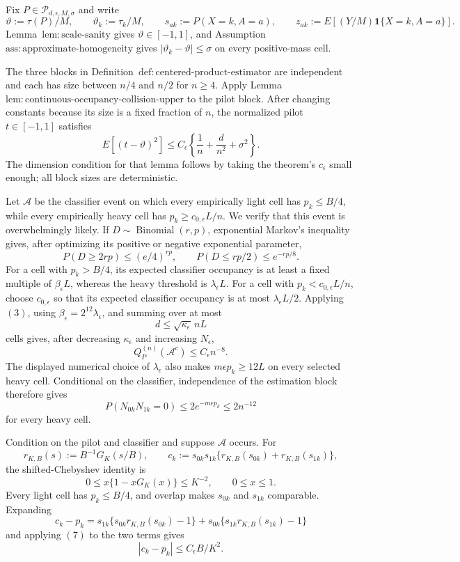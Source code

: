 Fix \(P\in\mathcal P_{d,\epsilon,M,\sigma}\) and write
\[
 \vartheta:=\tau(P)/M,\qquad
 \vartheta_k:=\tau_k/M,\qquad
 s_{ak}:=P(X=k,A=a),\qquad
 z_{ak}:=E[(Y/M)\mathbf 1\{X=k,A=a\}].
\tag{1}
\]
Lemma~\(\mathrm{lem:scale\text{-}sanity}\) gives \(\vartheta\in[-1,1]\), and Assumption~\(\mathrm{ass:approximate\text{-}homogeneity}\) gives \(|\vartheta_k-\vartheta|\le\sigma\) on every positive-mass cell.

The three blocks in Definition~\(\mathrm{def:centered\text{-}product\text{-}estimator}\) are independent and each has size between \(n/4\) and \(n/2\) for \(n\ge4\).  Apply Lemma~\(\mathrm{lem:continuous\text{-}occupancy\text{-}collision\text{-}upper}\) to the pilot block.  After changing constants because its size is a fixed fraction of \(n\), the normalized pilot \(t\in[-1,1]\) satisfies
\[
 E[(t-\vartheta)^2]
 \le C_{\epsilon}\left\{\frac1n+\frac d{n^2}+\sigma^2\right\}.
\tag{2}
\]
The dimension condition for that lemma follows by taking the theorem's \(c_{\epsilon}\) small enough; all block sizes are deterministic.

Let \(\mathcal A\) be the classifier event on which every empirically light cell has \(p_k\le B/4\), while every empirically heavy cell has \(p_k\ge c_{0,\epsilon}L/n\).  We verify that this event is overwhelmingly likely.  If \(D\sim\operatorname{Binomial}(r,p)\), exponential Markov's inequality gives, after optimizing its positive or negative exponential parameter,
\[
 P(D\ge2rp)\le(e/4)^{rp},
 \qquad
 P(D\le rp/2)\le e^{-rp/8}.
\tag{3}
\]
For a cell with \(p_k>B/4\), its expected classifier occupancy is at least a fixed multiple of \(\beta_{\epsilon}L\), whereas the heavy threshold is \(\lambda_{\epsilon}L\).  For a cell with \(p_k<c_{0,\epsilon}L/n\), choose \(c_{0,\epsilon}\) so that its expected classifier occupancy is at most \(\lambda_{\epsilon}L/2\).  Applying \((3)\), using \(\beta_{\epsilon}=2^{12}\lambda_{\epsilon}\), and summing over at most
\[
 d\le \sqrt{\kappa_{\epsilon}}\,nL
\]
cells gives, after decreasing \(\kappa_{\epsilon}\) and increasing \(N_{\epsilon}\),
\[
 Q_P^{(n)}(\mathcal A^c)\le C_{\epsilon}n^{-8}.
\tag{4}
\]
The displayed numerical choice of \(\lambda_{\epsilon}\) also makes \(m\epsilon p_k\ge12L\) on every selected heavy cell.  Conditional on the classifier, independence of the estimation block therefore gives
\[
 P(N_{0k}N_{1k}=0)\le2e^{-m\epsilon p_k}\le2n^{-12}
\tag{5}
\]
for every heavy cell.

Condition on the pilot and classifier and suppose \(\mathcal A\) occurs.  For
\[
 r_{K,B}(s):=B^{-1}G_K(s/B),
 \qquad
 c_k:=s_{0k}s_{1k}\{r_{K,B}(s_{0k})+r_{K,B}(s_{1k})\},
\tag{6}
\]
the shifted-Chebyshev identity is
\[
 0\le x\{1-xG_K(x)\}\le K^{-2},
 \qquad 0\le x\le1.
\tag{7}
\]
Every light cell has \(p_k\le B/4\), and overlap makes \(s_{0k}\) and \(s_{1k}\) comparable.  Expanding
\[
 c_k-p_k
 =s_{1k}\{s_{0k}r_{K,B}(s_{0k})-1\}
 +s_{0k}\{s_{1k}r_{K,B}(s_{1k})-1\}
\]
and applying \((7)\) to the two terms gives
\[
 |c_k-p_k|\le C_{\epsilon}B/K^2.
\tag{8}
\]

